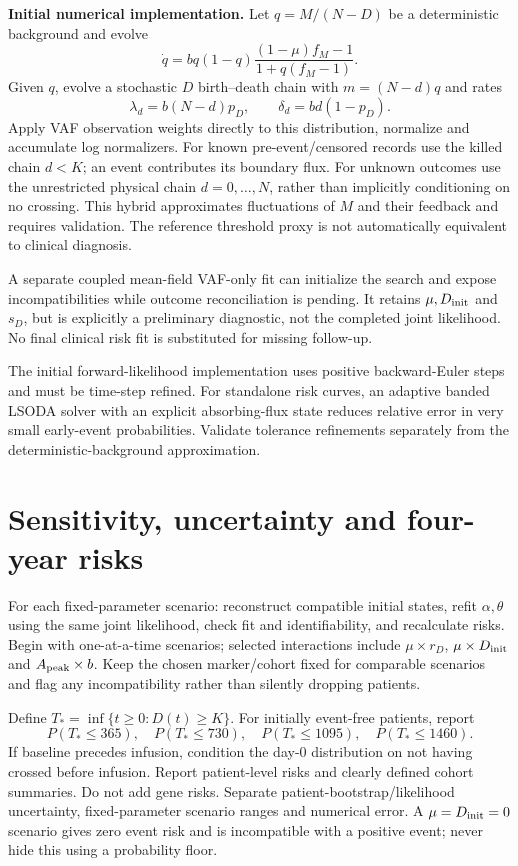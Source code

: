 \documentclass[11pt]{article}
\begin{document}
\textbf{Initial numerical implementation.} Let $q=M/(N-D)$ be a deterministic background and evolve
\[
\dot q=bq(1-q)\frac{(1-\mu)f_M-1}{1+q(f_M-1)}.
\]
Given $q$, evolve a stochastic $D$ birth--death chain with $m=(N-d)q$ and rates
\[
\lambda_d=b(N-d)p_D,\qquad \delta_d=bd(1-p_D).
\]
Apply VAF observation weights directly to this distribution, normalize and accumulate log normalizers. For known pre-event/censored records use the killed chain $d<K$; an event contributes its boundary flux. For unknown outcomes use the unrestricted physical chain $d=0,\ldots,N$, rather than implicitly conditioning on no crossing. This hybrid approximates fluctuations of $M$ and their feedback and requires validation. The reference threshold proxy is not automatically equivalent to clinical diagnosis.

A separate coupled mean-field VAF-only fit can initialize the search and expose incompatibilities while outcome reconciliation is pending. It retains $\mu,D_{\rm init}$ and $s_D$, but is explicitly a preliminary diagnostic, not the completed joint likelihood. No final clinical risk fit is substituted for missing follow-up.

The initial forward-likelihood implementation uses positive backward-Euler steps and must be time-step refined. For standalone risk curves, an adaptive banded LSODA solver with an explicit absorbing-flux state reduces relative error in very small early-event probabilities. Validate tolerance refinements separately from the deterministic-background approximation.

\section{Sensitivity, uncertainty and four-year risks}
For each fixed-parameter scenario: reconstruct compatible initial states, refit $\alpha,\theta$ using the same joint likelihood, check fit and identifiability, and recalculate risks. Begin with one-at-a-time scenarios; selected interactions include $\mu\times r_D$, $\mu\times D_{\rm init}$ and $A_{\rm peak}\times b$. Keep the chosen marker/cohort fixed for comparable scenarios and flag any incompatibility rather than silently dropping patients.

Define $T_*=\inf\{t\ge0:D(t)\ge K\}$. For initially event-free patients, report
\[
P(T_*\le365),\quad P(T_*\le730),\quad
P(T_*\le1095),\quad P(T_*\le1460).
\]
If baseline precedes infusion, condition the day-0 distribution on not having crossed before infusion. Report patient-level risks and clearly defined cohort summaries. Do not add gene risks. Separate patient-bootstrap/likelihood uncertainty, fixed-parameter scenario ranges and numerical error. A $\mu=D_{\rm init}=0$ scenario gives zero event risk and is incompatible with a positive event; never hide this using a probability floor.
\end{document}
